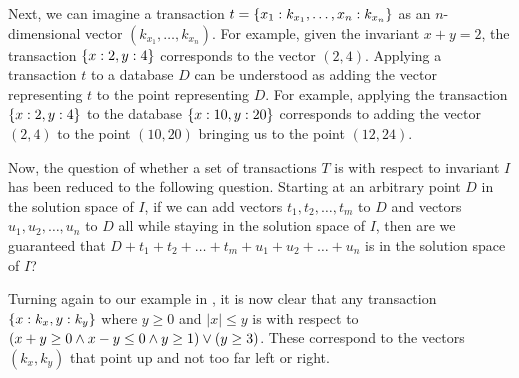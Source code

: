 Next, we can imagine a transaction $t = \left\{x_1:k_{x_1}, \ldots, x_n:k_{x_n}\right\}$
as an $n$-dimensional vector $(k_{x_1}, \ldots, k_{x_n})$. For example, given
the invariant $x + y = 2$, the transaction $\left\{x:2, y:4\right\}$ corresponds to the
vector $(2, 4)$. Applying a transaction $t$ to a database $D$ can be understood
as adding the vector representing $t$ to the point representing $D$.  For
example, applying the transaction $\left\{x:2, y:4\right\}$ to the database $\left\{x:10,
y:20\right\}$ corresponds to adding the vector $(2, 4)$ to the point $(10, 20)$
bringing us to the point $(12, 24)$.

Now, the question of whether a set of transactions $T$ is \iconfluent{} with
respect to invariant $I$ has been reduced to the following question. Starting
at an arbitrary point $D$ in the solution space of $I$, if we can add vectors
$t_1, t_2, \ldots, t_m$ to $D$ and vectors $u_1, u_2, \ldots, u_n$ to $D$ all
while staying in the solution space of $I$, then are we guaranteed that $D +
t_1 + t_2 + \ldots + t_m + u_1 + u_2 + \ldots + u_n$ is in the solution space
of $I$?

Turning again to our example in , it is now clear
that any transaction $\left\{x:k_x, y:k_y\right\}$ where $y \geq 0$ and $|x| \leq y$ is
\iconfluent{} with respect to $(x + y \geq 0 \land x - y \leq 0 \land y \geq 1) \lor (y \geq 3)$. These correspond to the vectors $(k_x,
k_y)$ that point up and not too far left or right.
